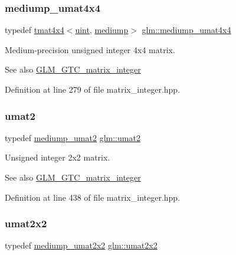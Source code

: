 \subsubsection{\texorpdfstring{mediump\_umat4x4}{mediump\_umat4x4}}
{\footnotesize\ttfamily typedef \mbox{\hyperlink{structglm_1_1tmat4x4}{tmat4x4}}$<$\mbox{\hyperlink{group__core__precision_ga4fd29415871152bfb5abd588334147c8}{uint}}, \mbox{\hyperlink{namespaceglm_a0f04f086094c747d227af4425893f545a6416f3ea0c9025fb21ed50c4d6620482}{mediump}}$>$ \mbox{\hyperlink{group__gtc__matrix__integer_ga7141a9d9f1c26521e397be34d19c1b8f}{glm\+::mediump\+\_\+umat4x4}}}

Medium-\/precision unsigned integer 4x4 matrix. \begin{DoxySeeAlso}{See also}
\mbox{\hyperlink{group__gtc__matrix__integer}{G\+L\+M\+\_\+\+G\+T\+C\+\_\+matrix\+\_\+integer}} 
\end{DoxySeeAlso}


Definition at line 279 of file matrix\+\_\+integer.\+hpp.

\mbox{\label{group__gtc__matrix__integer_gae2d45c058cfa0b60ab4df0cdda2d8516}} 
\subsubsection{\texorpdfstring{umat2}{umat2}}
{\footnotesize\ttfamily typedef \mbox{\hyperlink{group__gtc__matrix__integer_ga85bc35173415dba31bb964c2940feeec}{mediump\+\_\+umat2}} \mbox{\hyperlink{group__gtc__matrix__integer_gae2d45c058cfa0b60ab4df0cdda2d8516}{glm\+::umat2}}}

Unsigned integer 2x2 matrix. \begin{DoxySeeAlso}{See also}
\mbox{\hyperlink{group__gtc__matrix__integer}{G\+L\+M\+\_\+\+G\+T\+C\+\_\+matrix\+\_\+integer}} 
\end{DoxySeeAlso}


Definition at line 438 of file matrix\+\_\+integer.\+hpp.

\mbox{\label{group__gtc__matrix__integer_gad3c997b31dd69bdb4787867e758ed48d}} 
\subsubsection{\texorpdfstring{umat2x2}{umat2x2}}
{\footnotesize\ttfamily typedef \mbox{\hyperlink{group__gtc__matrix__integer_gafce8777b8b0d9d7f810853b22de3be1b}{mediump\+\_\+umat2x2}} \mbox{\hyperlink{group__gtc__matrix__integer_gad3c997b31dd69bdb4787867e758ed48d}{glm\+::umat2x2}}}

